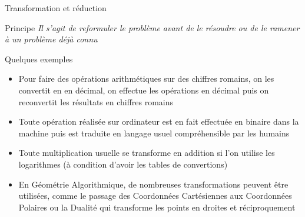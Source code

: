 \documentclass[aspectratio=1610,francais,envcountsect]{beamer}
\begin{document}
\begin{frame}{Transformation et réduction}

  \begin{alertblock}{Principe}
    \it Il s’agit de reformuler le problème avant de le résoudre ou de
    le ramener à un problème déjà connu
  \end{alertblock}

  \begin{exampleblock}{Quelques exemples}
    \begin{itemize}
    \item Pour faire des opérations arithmétiques sur des chiffres
      romains, on les convertit en en décimal, on effectue les
      opérations en décimal puis on reconvertit les résultats en
      chiffres romains
    \item Toute opération réalisée sur ordinateur est en fait
      effectuée en binaire dans la machine puis est traduite en
      langage usuel compréhensible par les humains
    \item Toute multiplication usuelle se transforme en addition si
      l’on utilise les logarithmes (à condition d’avoir les tables de
      convertions)
    \item En Géométrie Algorithmique, de nombreuses transformations
      peuvent être utilisées, comme le passage des Coordonnées
      Cartésiennes aux Coordonnées Polaires ou la Dualité qui
      transforme les points en droites et réciproquement

    \end{itemize}
  \end{exampleblock}
  
\end{frame}
\end{document}

